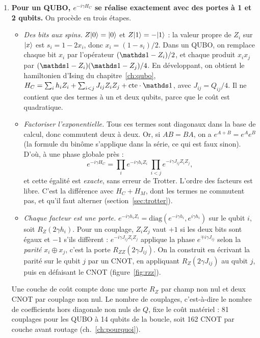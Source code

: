 \begin{enumerate}
\smallskip
Minimiser la moyenne concentre donc la probabilité vers les bonnes chaînes, mais ce n'est \emph{pas} la même chose que maximiser la probabilité de l'optimum. Avec trois chaînes d'énergies 0 (l'optimum), 1 et 10, la distribution $(\tfrac12,0,\tfrac12)$ a une moyenne de 5 et trouve l'optimum une fois sur deux ; la distribution $(0,1,0)$ a une moyenne de 1, bien meilleure, mais ne le trouve jamais. QAOA optimise la moyenne : il favorise les chaînes \og bonnes en moyenne\fg{} et évite d'abord les plus coûteuses, ce qui, dans notre projet, revient à éviter les pénalités (ch.~\ref{ch:pourquoi}).

\item \textbf{Pour un QUBO, $e^{-i\gamma H_C}$ se réalise exactement avec des portes à 1 et 2 qubits.} On procède en trois étapes.
\begin{itemize}
\item \emph{Des bits aux spins.} $Z\lvert 0\rangle=\lvert 0\rangle$ et $Z\lvert 1\rangle=-\lvert 1\rangle$ : la valeur propre de $Z_i$ sur $\lvert x\rangle$ est $s_i=1-2x_i$, donc $x_i=(1-s_i)/2$. Dans un QUBO, on remplace chaque bit $x_i$ par l'opérateur $(\Id-Z_i)/2$, et chaque produit $x_ix_j$ par $(\Id-Z_i)(\Id-Z_j)/4$. En développant, on obtient le hamiltonien d'Ising du chapitre~\ref{ch:qubo}, $H_C=\sum_ih_iZ_i+\sum_{i<j}J_{ij}Z_iZ_j+\text{cte}\cdot\Id$, avec $J_{ij}=Q_{ij}/4$. Il ne contient que des termes à un et deux qubits, parce que le coût est quadratique.
\item \emph{Factoriser l'exponentielle.} Tous ces termes sont diagonaux dans la base de calcul, donc commutent deux à deux. Or, si $AB=BA$, on a $e^{A+B}=e^Ae^B$ (la formule du binôme s'applique dans la série, ce qui est faux sinon). D'où, à une phase globale près :
\[ e^{-i\gamma H_C}=\prod_ie^{-i\gamma h_iZ_i}\ \prod_{i<j}e^{-i\gamma J_{ij}Z_iZ_j}, \]
et cette égalité est \emph{exacte}, sans erreur de Trotter. L'ordre des facteurs est libre. C'est la différence avec $H_C+H_M$, dont les termes ne commutent pas, et qu'il faut alterner (section~\ref{sec:trotter}).
\item \emph{Chaque facteur est une porte.} $e^{-i\gamma h_iZ_i}=\mathrm{diag}(e^{-i\gamma h_i},e^{i\gamma h_i})$ sur le qubit $i$, soit $R_Z(2\gamma h_i)$. Pour un couplage, $Z_iZ_j$ vaut $+1$ si les deux bits sont égaux et $-1$ s'ils diffèrent : $e^{-i\gamma J_{ij}Z_iZ_j}$ applique la phase $e^{\mp i\gamma J_{ij}}$ selon la \emph{parité} $x_i\oplus x_j$, c'est la porte $R_{ZZ}(2\gamma J_{ij})$. On la construit en écrivant la parité sur le qubit $j$ par un CNOT, en appliquant $R_Z(2\gamma J_{ij})$ au qubit $j$, puis en défaisant le CNOT (figure~\ref{fig:rzz}).
\end{itemize}
Une couche de coût compte donc une porte $R_Z$ par champ non nul et deux CNOT par couplage non nul. Le nombre de couplages, c'est-à-dire le nombre de coefficients hors diagonale non nuls de $Q$, fixe le coût matériel : 81 couplages pour les QUBO à 14 qubits de la boucle, soit 162 CNOT par couche avant routage (ch.~\ref{ch:pourquoi}).
\end{enumerate}

